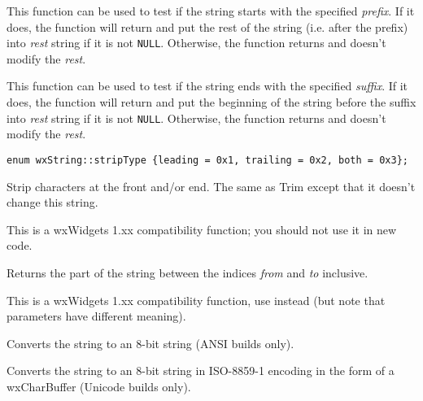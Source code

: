 This function can be used to test if the string starts with the specified 
{\it prefix}. If it does, the function will return \true and put the rest
of the string (i.e. after the prefix) into {\it rest} string if it is not 
{\tt NULL}. Otherwise, the function returns \false and doesn't modify the
{\it rest}.


\label{wxstringendswith}


This function can be used to test if the string ends with the specified 
{\it suffix}. If it does, the function will return \true and put the
beginning of the string before the suffix into {\it rest} string if it is not 
{\tt NULL}. Otherwise, the function returns \false and doesn't
modify the {\it rest}.


\label{wxstringstrip}

\begin{verbatim}
enum wxString::stripType {leading = 0x1, trailing = 0x2, both = 0x3};
\end{verbatim}


Strip characters at the front and/or end. The same as Trim except that it
doesn't change this string.

This is a wxWidgets 1.xx compatibility function; you should not use it in new code.


\label{wxstringsubstring}


Returns the part of the string between the indices {\it from} and {\it to}
inclusive.

This is a wxWidgets 1.xx compatibility function, use 
instead (but note that parameters have different meaning).


\label{wxstringto8bitdata}


Converts the string to an 8-bit string (ANSI builds only).


Converts the string to an 8-bit string in ISO-8859-1 encoding in the form of
a wxCharBuffer (Unicode builds only).

